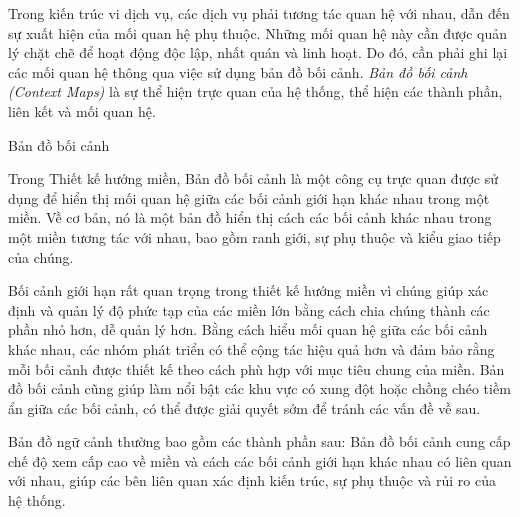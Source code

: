 Trong kiến trúc vi dịch vụ, các dịch vụ phải tương tác quan hệ với nhau, dẫn đến sự xuất hiện của mối quan hệ phụ thuộc. Những mối quan hệ này cần được quản lý chặt chẽ để hoạt động độc lập, nhất quán và linh hoạt. Do đó, cần phải ghi lại các mối quan hệ thông qua việc sử dụng bản đồ bối cảnh. \emph{Bản đồ bối cảnh (Context Maps)} là sự thể hiện trực quan của hệ thống, thể hiện các thành phần, liên kết và mối quan hệ.





Bản đồ bối cảnh

Trong Thiết kế hướng miền, Bản đồ bối cảnh là một công cụ trực quan được sử dụng để hiển thị mối quan hệ giữa các bối cảnh giới hạn khác nhau trong một miền. Về cơ bản, nó là một bản đồ hiển thị cách các bối cảnh khác nhau trong một miền tương tác với nhau, bao gồm ranh giới, sự phụ thuộc và kiểu giao tiếp của chúng.

Bối cảnh giới hạn rất quan trọng trong thiết kế hướng miền vì chúng giúp xác định và quản lý độ phức tạp của các miền lớn bằng cách chia chúng thành các phần nhỏ hơn, dễ quản lý hơn. Bằng cách hiểu mối quan hệ giữa các bối cảnh khác nhau, các nhóm phát triển có thể cộng tác hiệu quả hơn và đảm bảo rằng mỗi bối cảnh được thiết kế theo cách phù hợp với mục tiêu chung của miền. Bản đồ bối cảnh cũng giúp làm nổi bật các khu vực có xung đột hoặc chồng chéo tiềm ẩn giữa các bối cảnh, có thể được giải quyết sớm để tránh các vấn đề về sau.

Bản đồ ngữ cảnh thường bao gồm các thành phần sau: 
Bản đồ bối cảnh cung cấp chế độ xem cấp cao về miền và cách các bối cảnh giới hạn khác nhau có liên quan với nhau, giúp các bên liên quan xác định kiến trúc, sự phụ thuộc và rủi ro của hệ thống.
  





